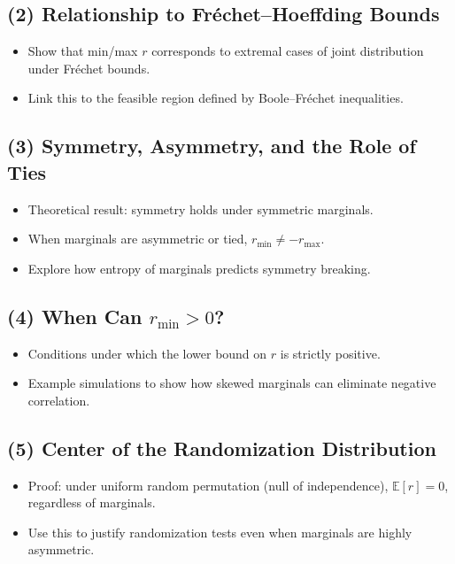 \documentclass[12pt]{article}
\begin{document}
\subsection{(2) Relationship to Fréchet–Hoeffding Bounds}
\begin{itemize}
  \item Show that min/max \( r \) corresponds to extremal cases of joint distribution under Fréchet bounds.
  \item Link this to the feasible region defined by Boole–Fréchet inequalities.
\end{itemize}

\subsection{(3) Symmetry, Asymmetry, and the Role of Ties}
\begin{itemize}
  \item Theoretical result: symmetry holds under symmetric marginals.
  \item When marginals are asymmetric or tied, \( r_{\min} \ne -r_{\max} \).
  \item Explore how entropy of marginals predicts symmetry breaking.
\end{itemize}

\subsection{(4) When Can \( r_{\min} > 0 \)?}
\begin{itemize}
  \item Conditions under which the lower bound on \( r \) is strictly positive.
  \item Example simulations to show how skewed marginals can eliminate negative correlation.
\end{itemize}

\subsection{(5) Center of the Randomization Distribution}
\begin{itemize}
  \item Proof: under uniform random permutation (null of independence), \( \mathbb{E}[r] = 0 \), regardless of marginals.
  \item Use this to justify randomization tests even when marginals are highly asymmetric.
\end{itemize}
\end{document}
